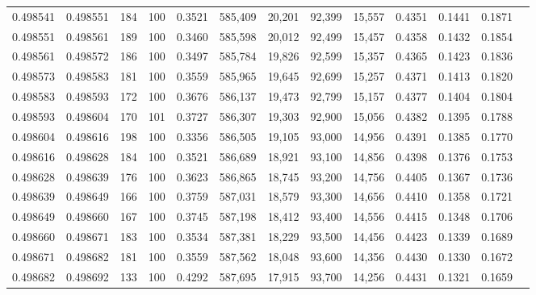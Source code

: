 \begin{tabular}{rrrrrrrrrrrrr}
0.498541 & 0.498551 &   184 & 100 &                                     0.3521 & 585,409 &  20,201 &  92,399 &  15,557 & 0.4351 & 0.1441 & 0.1871 \\
0.498551 & 0.498561 &   189 & 100 &                                     0.3460 & 585,598 &  20,012 &  92,499 &  15,457 & 0.4358 & 0.1432 & 0.1854 \\
0.498561 & 0.498572 &   186 & 100 &                                     0.3497 & 585,784 &  19,826 &  92,599 &  15,357 & 0.4365 & 0.1423 & 0.1836 \\
0.498573 & 0.498583 &   181 & 100 &                                     0.3559 & 585,965 &  19,645 &  92,699 &  15,257 & 0.4371 & 0.1413 & 0.1820 \\
0.498583 & 0.498593 &   172 & 100 &                                     0.3676 & 586,137 &  19,473 &  92,799 &  15,157 & 0.4377 & 0.1404 & 0.1804 \\
0.498593 & 0.498604 &   170 & 101 &                                     0.3727 & 586,307 &  19,303 &  92,900 &  15,056 & 0.4382 & 0.1395 & 0.1788 \\
0.498604 & 0.498616 &   198 & 100 &                                     0.3356 & 586,505 &  19,105 &  93,000 &  14,956 & 0.4391 & 0.1385 & 0.1770 \\
0.498616 & 0.498628 &   184 & 100 &                                     0.3521 & 586,689 &  18,921 &  93,100 &  14,856 & 0.4398 & 0.1376 & 0.1753 \\
0.498628 & 0.498639 &   176 & 100 &                                     0.3623 & 586,865 &  18,745 &  93,200 &  14,756 & 0.4405 & 0.1367 & 0.1736 \\
0.498639 & 0.498649 &   166 & 100 &                                     0.3759 & 587,031 &  18,579 &  93,300 &  14,656 & 0.4410 & 0.1358 & 0.1721 \\
0.498649 & 0.498660 &   167 & 100 &                                     0.3745 & 587,198 &  18,412 &  93,400 &  14,556 & 0.4415 & 0.1348 & 0.1706 \\
0.498660 & 0.498671 &   183 & 100 &                                     0.3534 & 587,381 &  18,229 &  93,500 &  14,456 & 0.4423 & 0.1339 & 0.1689 \\
0.498671 & 0.498682 &   181 & 100 &                                     0.3559 & 587,562 &  18,048 &  93,600 &  14,356 & 0.4430 & 0.1330 & 0.1672 \\
0.498682 & 0.498692 &   133 & 100 &                                     0.4292 & 587,695 &  17,915 &  93,700 &  14,256 & 0.4431 & 0.1321 & 0.1659 \\

\end{tabular}
